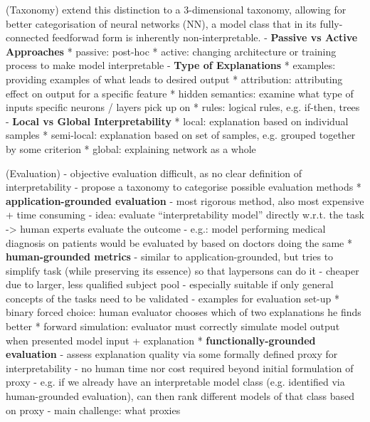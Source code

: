 \documentclass[twoside,11pt]{article}
\begin{document}
(Taxonomy)
\citet[chap. 2]{survey_NN_interpretability} extend this distinction to a 3-dimensional taxonomy, allowing for better categorisation of neural networks (NN), a model class
that in its fully-connected feedforwad form is inherently non-interpretable.
- \textbf{Passive vs Active Approaches}
  * passive: post-hoc
  * active: changing architecture or training process to make model interpretable
- \textbf{Type of Explanations}
  * examples: providing examples of what leads to desired output
  * attribution: attributing effect on output for a specific feature
  * hidden semantics: examine what type of inputs specific neurons / layers pick up on
  * rules: logical rules, e.g. if-then, trees
- \textbf{Local vs Global Interpretability}
  * local: explanation based on individual samples
  * semi-local: explanation based on set of samples, e.g. grouped together by some criterion
  * global: explaining network as a whole

(Evaluation)
- objective evaluation difficult, as no clear definition of interpretability
- \citet[3]{DoshiVelez2017TowardsAR} propose a taxonomy to categorise possible evaluation methods
  * \textbf{application-grounded evaluation}
    - most rigorous method, also most expensive + time consuming
    - idea: evaluate ``interpretability model'' directly w.r.t. the task -> human experts evaluate the outcome
    - e.g.: model performing medical diagnosis on patients would be evaluated by based on doctors doing the same
  * \textbf{human-grounded metrics}
    - similar to application-grounded, but tries to simplify task (while preserving its essence) so that laypersons can do it
    - cheaper due to larger, less qualified subject pool
    - especially suitable if only general concepts of the tasks need to be validated
    - examples for evaluation set-up
      * binary forced choice: human evaluator chooses which of two explanations he finds better
      * forward simulation: evaluator must correctly simulate model output when presented model input + explanation %
  * \textbf{functionally-grounded evaluation}
    - assess explanation quality via some formally defined proxy for interpretability
    - no human time nor cost required beyond initial formulation of proxy
    - e.g. if we already have an interpretable model class (e.g. identified via human-grounded evaluation), can then rank different models of that class based on proxy
    - main challenge: what proxies
\end{document}
